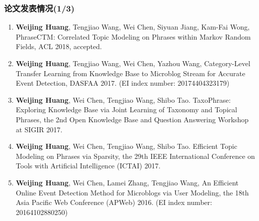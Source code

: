 \begin{transparentFootline}
\begin{frame}
\frametitle{\noindent 论文发表情况(1/3)}

\footnotesize
\begin{enumerate}
\item \textbf{Weijing Huang}, Tengjiao Wang, Wei Chen, Siyuan Jiang, Kam-Fai Wong, PhraseCTM: Correlated Topic Modeling on Phrases within Markov Random Fields, ACL 2018, accepted. 
\item \textbf{Weijing Huang}, Tengjiao Wang, Wei Chen, Yazhou Wang, Category-Level Transfer Learning from Knowledge Base to Microblog Stream for Accurate Event Detection, DASFAA 2017. (EI index number: 20174404323179)
\item \textbf{Weijing Huang}, Wei Chen, Tengjiao Wang, Shibo Tao. TaxoPhrase: Exploring Knowledge Base via Joint Learning of Taxonomy and Topical Phrases, the 2nd Open Knowledge Base and Question Answering Workshop at SIGIR 2017.
\item \textbf{Weijing Huang}, Wei Chen, Tengjiao Wang, Shibo Tao. Efficient Topic Modeling on Phrases via Sparsity, the 29th IEEE International Conference on Tools with Artificial Intelligence (ICTAI) 2017. 
\item \textbf{Weijing Huang}, Wei Chen, Lamei Zhang, Tengjiao Wang, An Efficient Online Event Detection Method for Microblogs via User Modeling, the 18th Asia Pacific Web Conference (APWeb) 2016. (EI index number: 20164102880250)
\end{enumerate}
\end{frame}
\end{transparentFootline}

